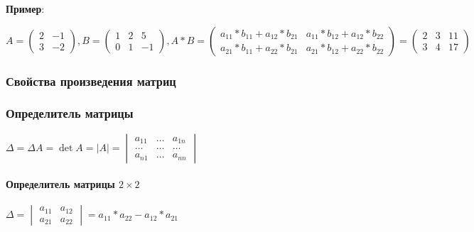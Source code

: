 \documentclass{article}
\begin{document}
\begin{flushleft}
\textbf{Пример}:

\hspace{5mm} $A = \begin{pmatrix}
    2 & -1 \\
    3 & -2
\end{pmatrix}, B = \begin{pmatrix}
    1 & 2 & 5 \\
    0 & 1 & -1
\end{pmatrix}, A * B = \begin{pmatrix}
    a_{11} * b_{11} + a_{12} * b_{21} & a_{11} * b_{12} + a_{12} * b_{22} \\
    a_{21} * b_{11} + a_{22} * b_{21} & a_{21} * b_{12} + a_{22} * b_{22}
\end{pmatrix} = \begin{pmatrix}
    2 & 3 & 11 \\
    3 & 4 & 17
\end{pmatrix}$

\subsubsection{Свойства произведения матриц}

\begin{multienumerate}
\end{multienumerate}

\subsubsection{Определитель матрицы}

$\Delta = \Delta A = \det A = |A| = \begin{vmatrix}
    a_{11} & \dots & a_{1n} \\
    \dots & \dots & \dots \\
    a_{n1} & \dots & a_{n n}
\end{vmatrix}$

\paragraph{Определитель матрицы $2 \times 2$}

\hfill

\hspace{5mm} $\Delta = \begin{vmatrix}
    a_{11} & a_{12} \\
    a_{21} & a_{22}
\end{vmatrix} = a_{11} * a_{22} - a_{12} * a_{21}$


\end{flushleft}
\end{document}
